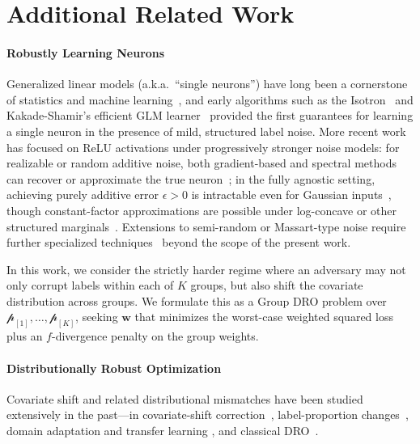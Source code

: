 \documentclass[11pt]{article}
\newcounter{thm}
\numberwithin{thm}{section}
\theoremstyle{plain}
\theoremstyle{definition}
\theoremstyle{remark} \newtheorem{remark}[thm]{Remark}
\def\eps{{\epsilon}}
\def\vw{{\bm{w}}}
\def\pp{{\mathcal{p}}}
\begin{document}
\section{Additional Related Work}\label{sec:related_work}

\paragraph{Robustly Learning Neurons}
Generalized linear models (a.k.a.\ ``single neurons'') have long been a cornerstone of statistics and machine learning~\citep{nelder1972generalized}, and early algorithms such as the Isotron~\citep{kalai2009isotron} and Kakade-Shamir's efficient GLM learner~\citep{kakade2011efficient} provided the first guarantees for learning a single neuron in the presence of mild, structured label noise.  More recent work has focused on ReLU activations under progressively stronger noise models: for realizable or random additive noise, both gradient-based and spectral methods can recover or approximate the true neuron~\citep{soltanolkotabi2017learning,kalan2019fitting,yehudai2020learning}; in the fully agnostic setting, achieving purely additive error \(\eps > 0\) is intractable even for Gaussian inputs~\citep{DKZ20-sq-reg,GGK20,diakonikolas22a-hardness}, though constant-factor approximations are possible under log-concave or other structured marginals~\citep{DGKKS20,DKTZ22,wang2023robustly-learning}.  Extensions to semi-random or Massart-type noise require further specialized techniques~\citep{diakonikolas2021relu,karmakar2020study,chen2020classification,diakonikolas2019distribution} beyond the scope of the present work.  

In this work, we consider the strictly harder regime where an adversary may not only corrupt labels within each of \(K\) groups, but also shift the covariate distribution across groups.  We formulate this as a Group DRO problem over \(\pp_{[1]},\dots,\pp_{[K]}\), seeking \(\vw\) that minimizes the worst-case weighted squared loss plus an \(f\)-divergence penalty on the group weights.  

\paragraph{Distributionally Robust Optimization}
Covariate shift and related distributional mismatches have been studied extensively in the past---in covariate-shift correction~\citep{shimodaira2000improving,huang2006correcting,bickel2007discriminative}, label-proportion changes~\citep{dwork2012fairness,xu2020class}, domain adaptation and transfer learning \citetext{\citealp{mansour2009domain,pan2009survey,ben2010theory} \citealp{patel2015visual,tan2018survey}}, and classical DRO~\citep{ben2009robust,shapiro2017distributionally}.
\end{document}
